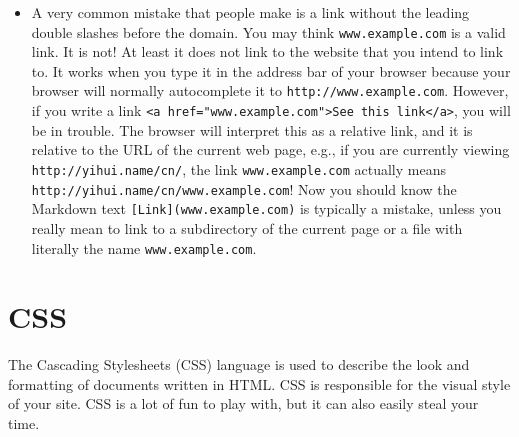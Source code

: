 \documentclass[12pt,]{krantz}
\theoremstyle{definition}
\theoremstyle{definition}
\theoremstyle{definition}
\theoremstyle{remark}
\begin{document}
\begin{itemize}
\begin{itemize}
    will work if the image can be accessed via HTTPS, i.e.,
    \texttt{https://example.com/foo.png}. The main drawback of not
    including the protocol is that such links and paths do not work if
    you open the HTML file locally without using a web server, e.g.,
    only double-click the HTML file in your file browser and show it in
    the browser.\footnote{That is because without a web server, an HTML
      file is viewed via the protocol \texttt{file}. For example, you
      may see a URL of the form \texttt{file://path/to/the/file.html} in
      the address bar of your browser. The path
      \texttt{//example.com/foo.png} will be interpreted as
      \texttt{file://example.com/foo.png}, which is unlikely to exist as
      a local file on your computer.}
  \item
    A very common mistake that people make is a link without the leading
    double slashes before the domain. You may think
    \texttt{www.example.com} is a valid link. It is not! At least it
    does not link to the website that you intend to link to. It works
    when you type it in the address bar of your browser because your
    browser will normally autocomplete it to
    \texttt{http://www.example.com}. However, if you write a link
    \texttt{\textless{}a\ href="www.example.com"\textgreater{}See\ this\ link\textless{}/a\textgreater{}},
    you will be in trouble. The browser will interpret this as a
    relative link, and it is relative to the URL of the current web
    page, e.g., if you are currently viewing
    \texttt{http://yihui.name/cn/}, the link \texttt{www.example.com}
    actually means \texttt{http://yihui.name/cn/www.example.com}! Now
    you should know the Markdown text
    \texttt{{[}Link{]}(www.example.com)} is typically a mistake, unless
    you really mean to link to a subdirectory of the current page or a
    file with literally the name \texttt{www.example.com}.
  \end{itemize}
\end{itemize}

\hypertarget{css}{%
\section{CSS}\label{css}}

The Cascading Stylesheets (CSS) language is used to describe
the look and formatting of documents written in HTML. CSS is responsible
for the visual style of your site. CSS is a lot of fun to play with, but
it can also easily steal your time.
\end{document}

